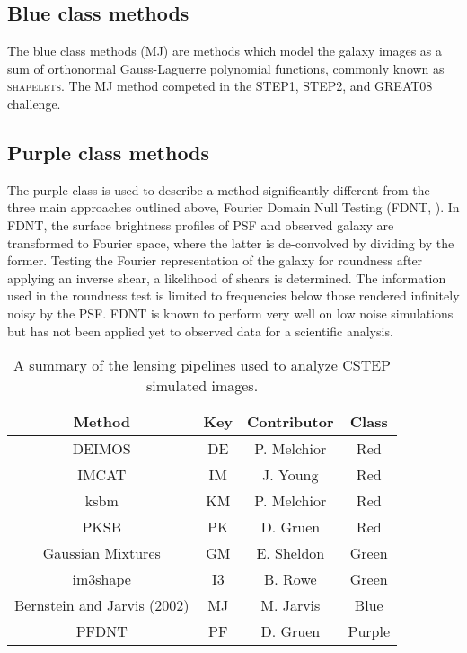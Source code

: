 \subsection{Blue class methods}
The blue class methods (MJ) are methods which model the
galaxy images as a sum of orthonormal Gauss-Laguerre polynomial
functions, commonly known as \textsc{shapelets}. The MJ
method competed in the STEP1, STEP2, and GREAT08 challenge. 


\subsection{Purple class methods}
The purple class is used to describe a method significantly different from the
three main approaches outlined above, Fourier Domain Null Testing (FDNT,
\citealt{Bern}). In FDNT, the surface brightness profiles of PSF and
observed galaxy are transformed to Fourier space, where the latter is
de-convolved by dividing by the former. Testing the Fourier
representation of the galaxy for roundness after applying an inverse
shear, a likelihood of shears is determined. The information used in
the roundness test is limited to frequencies below those rendered
infinitely noisy by the PSF. FDNT is known to perform very well on low
noise simulations \citep{Bern} but has not been applied yet to
observed data for a scientific analysis.
 
\begin{table}
\begin{center}
  \begin{tabular}{| c | c | c| c | }
    \hline 
     Method & Key & Contributor & Class \\
    \hline
     DEIMOS & DE &  P. Melchior & Red  \\
    \hline
    IMCAT & IM & J. Young & Red  \\
    \hline
    ksbm &  KM & P. Melchior &  Red \\
    \hline
    PKSB & PK & D. Gruen & Red \\
    \hline
     Gaussian Mixtures & GM & E. Sheldon & Green \\
    \hline
     im3shape &  I3 &  B. Rowe & Green \\
    \hline
     Bernstein and Jarvis (2002) & MJ &  M. Jarvis & Blue \\
    \hline
     PFDNT &  PF & D. Gruen & Purple \\
    \hline
  \end{tabular}
\end{center}
\caption{ A summary of the lensing pipelines used to analyze CSTEP simulated images. }
\label{table:smp}
\end{table}